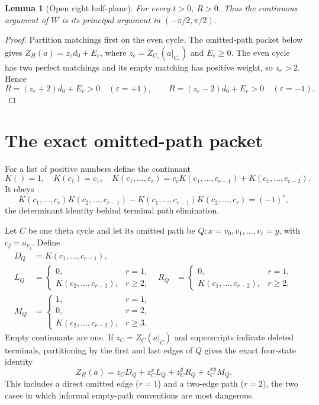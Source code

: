 \documentclass[11pt]{article}
\newtheorem{lemma}[theorem]{Lemma}
\theoremstyle{remark}
\begin{document}
\begin{lemma}[Open right half-plane]\label{lem:rhp}
For every $t>0$, $R>0$.  Thus the continuous argument of $W$ is its principal
argument in $(-\pi/2,\pi/2)$.
\end{lemma}

\begin{proof}
Partition matchings first on the even cycle.  The omitted-path packet below
gives $Z_H(a)=z_ed_0+E_e$, where
$z_e=Z_{C_e}(a|_{C_e})$ and $E_e\geq0$.  The even cycle has two perfect
matchings and its empty matching has positive weight, so $z_e>2$.  Hence
\[
 R=(z_e+2)d_0+E_e>0\quad(\varepsilon=+1),\qquad
 R=(z_e-2)d_0+E_e>0\quad(\varepsilon=-1).
\]
\end{proof}

\section{The exact omitted-path packet}

For a list of positive numbers define the continuant
\[
 K()=1,\quad K(c_1)=c_1,\quad
 K(c_1,\ldots,c_r)=c_rK(c_1,\ldots,c_{r-1})+K(c_1,\ldots,c_{r-2}).
\]
It obeys
\begin{equation}\label{eq:continuant-det}
 K(c_1,\ldots,c_r)K(c_2,\ldots,c_{r-1})
 -K(c_1,\ldots,c_{r-1})K(c_2,\ldots,c_r)=(-1)^r,
\end{equation}
the determinant identity behind terminal path elimination.

Let $C$ be one theta cycle and let its omitted path be
$Q:x=v_0,v_1,\ldots,v_r=y$, with $c_j=a_{v_j}$.  Define
\begin{align*}
 D_Q&=K(c_1,\ldots,c_{r-1}),\\
 L_Q&=\begin{cases}0,&r=1,\\K(c_2,\ldots,c_{r-1}),&r\geq2,\end{cases}
 &R_Q&=\begin{cases}0,&r=1,\\K(c_1,\ldots,c_{r-2}),&r\geq2,\end{cases}\\
 M_Q&=\begin{cases}1,&r=1,\\0,&r=2,\\
 K(c_2,\ldots,c_{r-2}),&r\geq3.
 \end{cases}
\end{align*}
Empty continuants are one.  If $z_C=Z_C(a|_C)$ and superscripts indicate
deleted terminals, partitioning by the first and last edges of $Q$ gives the
exact four-state identity
\begin{equation}\label{eq:packet}
 Z_H(a)=z_CD_Q+z_C^xL_Q+z_C^yR_Q+z_C^{xy}M_Q.
\end{equation}
This includes a direct omitted edge ($r=1$) and a two-edge path ($r=2$), the
two cases in which informal empty-path conventions are most dangerous.
\end{document}
